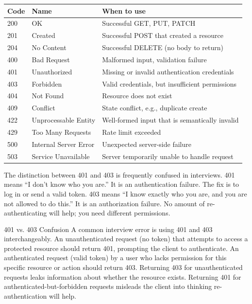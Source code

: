 \documentclass[11pt,a4paper]{article}
\begin{document}
\begin{center}
\begin{tabular}{lll}
\toprule
\textbf{Code} & \textbf{Name} & \textbf{When to use} \\
\midrule
200 & OK                    & Successful GET, PUT, PATCH \\
201 & Created               & Successful POST that created a resource \\
204 & No Content            & Successful DELETE (no body to return) \\
400 & Bad Request           & Malformed input, validation failure \\
401 & Unauthorized          & Missing or invalid authentication credentials \\
403 & Forbidden             & Valid credentials, but insufficient permissions \\
404 & Not Found             & Resource does not exist \\
409 & Conflict              & State conflict, e.g., duplicate create \\
422 & Unprocessable Entity  & Well-formed input that is semantically invalid \\
429 & Too Many Requests     & Rate limit exceeded \\
500 & Internal Server Error & Unexpected server-side failure \\
503 & Service Unavailable   & Server temporarily unable to handle request \\
\bottomrule
\end{tabular}
\end{center}

The distinction between 401 and 403 is frequently confused in interviews. 401 means ``I don't know who you are.'' It is an authentication failure. The fix is to log in or send a valid token. 403 means ``I know exactly who you are, and you are not allowed to do this.'' It is an authorization failure. No amount of re-authenticating will help; you need different permissions.

\begin{trapbox}{401 vs. 403 Confusion}
A common interview error is using 401 and 403 interchangeably. An unauthenticated request (no token) that attempts to access a protected resource should return 401, prompting the client to authenticate. An authenticated request (valid token) by a user who lacks permission for this specific resource or action should return 403. Returning 403 for unauthenticated requests leaks information about whether the resource exists. Returning 401 for authenticated-but-forbidden requests misleads the client into thinking re-authentication will help.
\end{trapbox}
\end{document}
